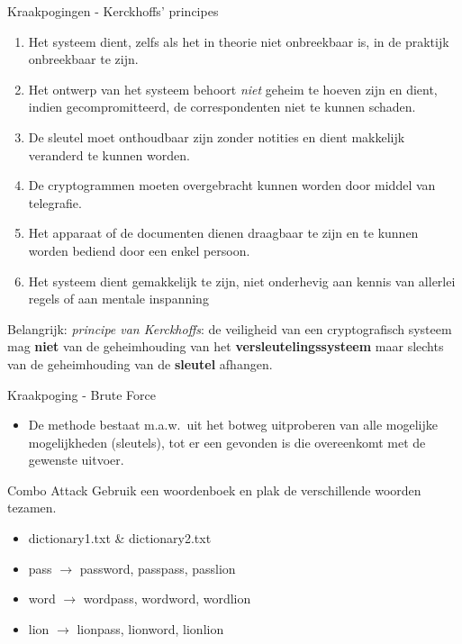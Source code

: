 \documentclass{beamer}
\begin{document}
\begin{frame}{Kraakpogingen - Kerckhoffs' principes}
	
	\begin{enumerate}
		\item Het systeem dient, zelfs als het in theorie niet onbreekbaar is, in de praktijk onbreekbaar te zijn. \pause
		\item \textcolor{HoGentAccent1}{Het ontwerp van het systeem behoort \emph{niet} geheim te hoeven zijn en dient, indien gecompromitteerd, de correspondenten niet te kunnen schaden.}\pause
		\item De sleutel moet onthoudbaar zijn zonder notities en dient makkelijk veranderd te kunnen worden.\pause
		\item De cryptogrammen moeten overgebracht kunnen worden door middel van telegrafie.\pause
		\item Het apparaat of de documenten dienen draagbaar te zijn en te kunnen worden bediend door een enkel persoon.\pause
		\item Het systeem dient gemakkelijk te zijn, niet onderhevig aan kennis van allerlei regels of aan mentale inspanning\pause
\end{enumerate}
	\textcolor{HoGentAccent1}{Belangrijk: \textit{principe van Kerckhoffs}}: de veiligheid van een cryptografisch systeem mag \textbf{niet} van de geheimhouding van het \textbf{versleutelingssysteem} maar slechts van de geheimhouding van de \textbf{sleutel} afhangen.

\end{frame}

\begin{frame}{Kraakpoging - Brute Force}

\begin{itemize}
	\item 	 De methode bestaat m.a.w.\ uit het botweg uitproberen van alle mogelijke mogelijkheden (sleutels), 
	 tot er een gevonden is die overeenkomt met de gewenste uitvoer.
\end{itemize}
\end{frame}

\begin{frame}{Combo Attack}
	Gebruik een woordenboek en plak de verschillende woorden tezamen.
	\begin{itemize}
		\item dictionary1.txt \& dictionary2.txt
		\item pass $ \rightarrow $ password, passpass, passlion
		\item word $ \rightarrow $ wordpass, wordword, wordlion
		\item lion $ \rightarrow $ lionpass, lionword, lionlion 
	\end{itemize}
\end{frame}
\end{document}
